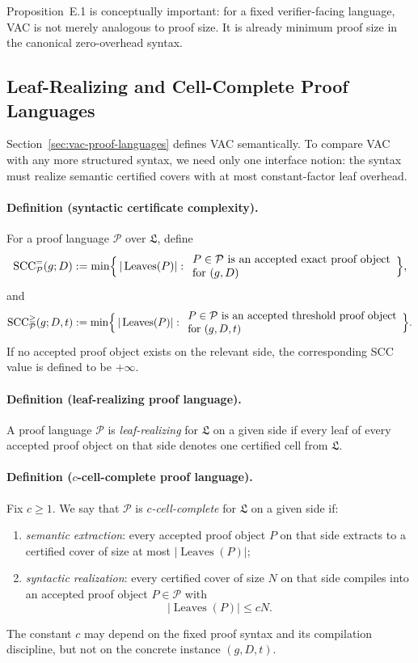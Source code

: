 Proposition~E.1 is conceptually important: for a fixed verifier-facing language, VAC is not merely analogous to proof size. It is already minimum proof size in the canonical zero-overhead syntax.

\subsection{Leaf-Realizing and Cell-Complete Proof Languages}

Section~\ref{sec:vac-proof-languages} defines VAC semantically. To compare VAC with any more structured syntax, we need only one interface notion: the syntax must realize semantic certified covers with at most constant-factor leaf overhead.

\paragraph{Definition (syntactic certificate complexity).}
For a proof language $\mathcal P$ over $\mathfrak L$, define
\[
\mathrm{SCC}^{=}_{\mathcal P}(g;D)
:=
\min\Bigl\{\,|\operatorname{Leaves}(P)|:
\begin{array}{l}
P\in\mathcal P\text{ is an accepted exact proof object}\\
\text{for }(g,D)
\end{array}
\Bigr\},
\]
and
\[
\mathrm{SCC}^{\ge}_{\mathcal P}(g;D,t)
:=
\min\Bigl\{\,|\operatorname{Leaves}(P)|:
\begin{array}{l}
P\in\mathcal P\text{ is an accepted threshold proof object}\\
\text{for }(g,D,t)
\end{array}
\Bigr\}.
\]
If no accepted proof object exists on the relevant side, the corresponding SCC value is defined to be $+\infty$.

\paragraph{Definition (leaf-realizing proof language).}
A proof language $\mathcal P$ is \emph{leaf-realizing} for $\mathfrak L$ on a given side if every leaf of every accepted proof object on that side denotes one certified cell from $\mathfrak L$.

\paragraph{Definition ($c$-cell-complete proof language).}
Fix $c\ge 1$. We say that $\mathcal P$ is \emph{$c$-cell-complete} for $\mathfrak L$ on a given side if:
\begin{enumerate}
    \item \emph{semantic extraction}: every accepted proof object $P$ on that side extracts to a certified cover of size at most $|\operatorname{Leaves}(P)|$;
    \item \emph{syntactic realization}: every certified cover of size $N$ on that side compiles into an accepted proof object $P\in\mathcal P$ with
    \[
    |\operatorname{Leaves}(P)|\le cN.
    \]
\end{enumerate}
The constant $c$ may depend on the fixed proof syntax and its compilation discipline, but not on the concrete instance $(g,D,t)$.


